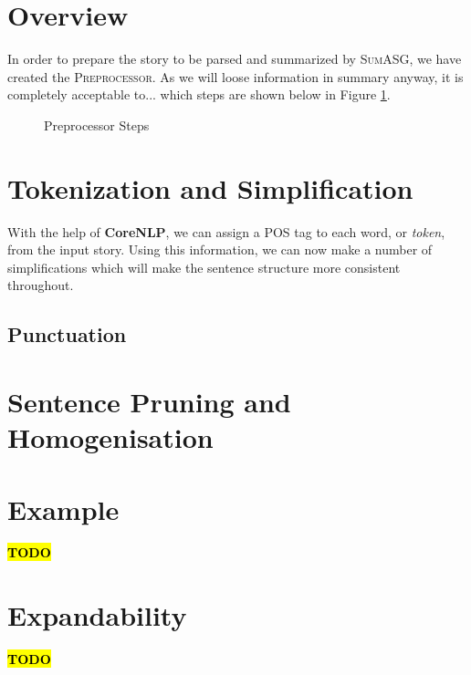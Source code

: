 \section{Overview}

In order to prepare the story to be parsed and summarized by \textsc{SumASG}, we have created the \textsc{Preprocessor}. As we will loose information in summary anyway, it is completely acceptable to... which steps are shown below in Figure \ref{fig:preprocessor_pipeline}.

\begin{figure}[H]
\centering
{}
\caption{Preprocessor Steps}
\label{fig:preprocessor_pipeline}
\end{figure}

\section{Tokenization and Simplification}

With the help of \textbf{CoreNLP}, we can assign a POS tag to each word, or \textit{token}, from the input story. Using this information, we can now make a number of simplifications which will make the sentence structure more consistent throughout.

\subsection{Punctuation}

\section{Sentence Pruning and Homogenisation}

\section{Example}

\textcolor{red}{\textbf{\hl{TODO}}}

\section{Expandability}

\textcolor{red}{\textbf{\hl{TODO}}}